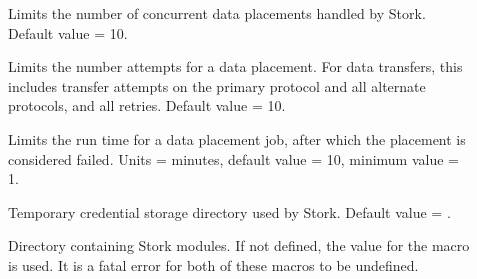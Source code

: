 \begin{description}

\item[]
\label{param:StorkMaxNumJobs}
Limits the number of concurrent data placements handled by Stork.
Default value = 10.

\item[]
\label{param:StorkMaxRetry}
Limits the number attempts for a data placement.  For data transfers,
this includes transfer attempts on the primary protocol and all
alternate protocols, and all retries.
Default value = 10.

\item[]
\label{param:StorkMaxDelayInMinutes}
Limits the run time for a data placement job, after which the
placement is considered failed.
Units = minutes, default value = 10, minimum value = 1.

\item[]
\label{param:StorkTmpCredDir}
Temporary credential storage directory used by Stork.
Default value = .

\item[]
\label{param:StorkModuleDir}
Directory containing Stork modules.  If not defined, the value for the
 macro is used.  It is a fatal error for
both of these macros to be undefined.

\end{description}

